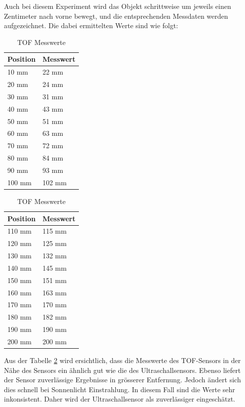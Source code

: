 \documentclass[../main.tex]{subfiles}
\begin{document}
Auch bei diesem Experiment wird das Objekt schrittweise um jeweils einen Zentimeter nach vorne bewegt, und die entsprechenden Messdaten werden aufgezeichnet. Die dabei ermittelten Werte sind wie folgt:
\begin{table}[H]
\centering
\begin{minipage}{0.45\textwidth}
\centering
\begin{tabular}{@{}ll@{}}
\toprule
\textbf{Position} & \textbf{Messwert} \\
\midrule
10 mm  & 22 mm  \\
20 mm  & 24 mm  \\
30 mm  & 31 mm  \\
40 mm  & 43 mm  \\
50 mm  & 51 mm  \\
60 mm  & 63 mm  \\
70 mm  & 72 mm  \\
80 mm  & 84 mm  \\
90 mm  & 93 mm  \\
100 mm & 102 mm \\
\bottomrule
\end{tabular}
\end{minipage}%
\hspace{0.05\textwidth} %
\begin{minipage}{0.45\textwidth}
\centering
\begin{tabular}{@{}ll@{}}
\toprule
\textbf{Position} & \textbf{Messwert} \\
\midrule
110 mm & 115 mm \\
120 mm & 125 mm \\
130 mm & 132 mm \\
140 mm & 145 mm \\
150 mm & 151 mm \\
160 mm & 163 mm \\
170 mm & 170 mm \\
180 mm & 182 mm \\
190 mm & 190 mm \\
200 mm & 200 mm \\
\bottomrule
\end{tabular}
\end{minipage}
\caption{TOF Messwerte}
\label{tab:TOFMD}
\end{table}

Aus der Tabelle \ref{tab:TOFMD} wird ersichtlich, dass die Messwerte des TOF-Sensors in der Nähe des Sensors ein ähnlich gut wie die des Ultraschallsensors. Ebenso liefert der Sensor zuverlässige Ergebnisse in grösserer Entfernung. Jedoch ändert sich dies schnell bei Sonnenlicht Einstrahlung. In diesem Fall sind die Werte sehr inkonsistent. Daher wird der Ultraschallsensor als zuverlässiger eingeschätzt.
\end{document}
